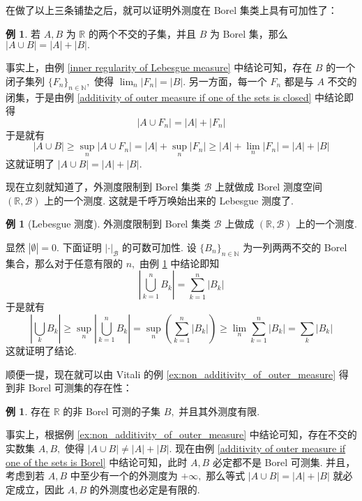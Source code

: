 \documentclass[12pt, a4paper, oneside]{book}
\numberwithin{figure}{section}
\theoremstyle{definition}
\newtheorem{example}[theorem]{例}
\begin{document}
在做了以上三条铺垫之后，就可以证明外测度在 Borel 集类上具有可加性了：
\begin{example}\label{additivity of outer measure if one of the sets is Borel}
    若 $A,B$ 为 $\mathbb R$ 的两个不交的子集，并且 $B$ 为 Borel 集，那么 $|A\cup B|=|A|+|B|.$
\end{example}
事实上，由例 \ref{inner regularity of Lebesgue measure} 中结论可知，存在 $B$ 的一个闭子集列 $\{F_n\}_{n\in\mathbb N},$ 使得 $\lim_n |F_n|=|B|.$ 
另一方面，每一个 $F_n$ 都是与 $A$ 不交的闭集，于是由例 \ref{additivity of outer measure if one of the sets is closed} 中结论即得 
\begin{equation}
    |A\cup F_n|=|A|+|F_n|
\end{equation}
于是就有
\begin{equation}
    |A\cup B|\geq \sup_n |A\cup F_n|=|A|+\sup_n |F_n|\geq |A|+\lim_n |F_n|=|A|+|B|
\end{equation}
这就证明了 $|A\cup B|=|A|+|B|.$

现在立刻就知道了，外测度限制到 Borel 集类 $\mathcal B$ 上就做成 Borel 测度空间 $(\mathbb R,\mathcal B)$ 上的一个测度. 这就是千呼万唤始出来的 Lebesgue 测度了.
\begin{example}[Lebesgue 测度]
    外测度限制到 Borel 集类 $\mathcal B$ 上做成 $(\mathbb R,\mathcal B)$ 上的一个测度.
\end{example}
显然 $|\emptyset|=0.$ 下面证明 $|\cdot|_{\mathcal B}$ 的可数可加性. 设 $\{B_n\}_{n\in\mathbb N}$ 为一列两两不交的 Borel 集合，那么对于任意有限的 $n,$ 由例 \ref{additivity of outer measure if one of the sets is Borel} 中结论即知
\begin{equation}
    \left|\bigcup_{k=1}^n B_k\right|=\sum_{k=1}^n |B_k|
\end{equation}
于是就有
\begin{equation}
    \left|\bigcup_k B_k\right|\geq \sup_n \left|\bigcup_{k=1}^n B_k\right|=\sup_n \left(\sum_{k=1}^n |B_k|\right)\geq \lim_n \sum_{k=1}^n |B_k|=\sum_k |B_k|
\end{equation}
这就证明了结论.

顺便一提，现在就可以由 Vitali 的例 \eqref{ex:non_additivity_of_outer_measure} 得到非 Borel 可测集的存在性：
\begin{example}\label{ex:existence of non-Borel measurable sets}
    存在 $\mathbb R$ 的非 Borel 可测的子集 $B,$ 并且其外测度有限.
\end{example}

事实上，根据例 \eqref{ex:non_additivity_of_outer_measure} 中结论可知，存在不交的实数集 $A,B,$ 使得 $|A\cup B|\neq |A|+|B|.$ 
现在由例 \eqref{additivity of outer measure if one of the sets is Borel} 中结论可知，此时 $A,B$ 必定都不是 Borel 可测集. 并且，考虑到若 $A,B$ 中至少有一个的外测度为
$+\infty,$ 那么等式 $|A\cup B|=|A|+|B|$ 就必定成立，因此 $A,B$ 的外测度也必定是有限的.
\end{document}
